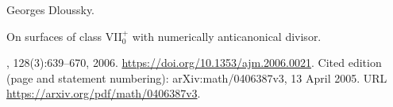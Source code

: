 Georges Dloussky.

\newblock On surfaces of class {VII}$_0^+$ with numerically anticanonical
  divisor.

, 128(3):639--670, 2006.
\newblock \url{https://doi.org/10.1353/ajm.2006.0021}.
\newblock Cited edition (page and statement numbering): arXiv:math/0406387v3, 13 April 2005.
\newblock URL \url{https://arxiv.org/pdf/math/0406387v3}.


